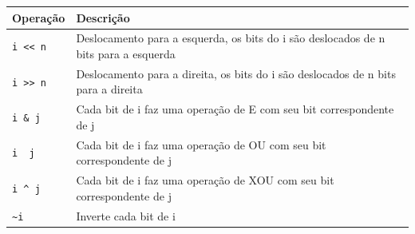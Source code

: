 \documentclass[
]{article}
\begin{document}
\begin{longtable}[]{@{}ll@{}}
\toprule
\begin{minipage}[b]{0.14\columnwidth}\raggedright
Operação\strut
\end{minipage} & \begin{minipage}[b]{0.80\columnwidth}\raggedright
Descrição\strut
\end{minipage}\tabularnewline
\midrule
\endhead
\begin{minipage}[t]{0.14\columnwidth}\raggedright
\texttt{i\ \textless{}\textless{}\ n}\strut
\end{minipage} & \begin{minipage}[t]{0.80\columnwidth}\raggedright
Deslocamento para a esquerda, os bits do i são deslocados de n bits para
a esquerda\strut
\end{minipage}\tabularnewline
\begin{minipage}[t]{0.14\columnwidth}\raggedright
\texttt{i\ \textgreater{}\textgreater{}\ n}\strut
\end{minipage} & \begin{minipage}[t]{0.80\columnwidth}\raggedright
Deslocamento para a direita, os bits do i são deslocados de n bits para
a direita\strut
\end{minipage}\tabularnewline
\begin{minipage}[t]{0.14\columnwidth}\raggedright
\texttt{i\ \&\ j}\strut
\end{minipage} & \begin{minipage}[t]{0.80\columnwidth}\raggedright
Cada bit de i faz uma operação de E com seu bit correspondente de
j\strut
\end{minipage}\tabularnewline
\begin{minipage}[t]{0.14\columnwidth}\raggedright
\texttt{i\ \textbar{}\ j}\strut
\end{minipage} & \begin{minipage}[t]{0.80\columnwidth}\raggedright
Cada bit de i faz uma operação de OU com seu bit correspondente de
j\strut
\end{minipage}\tabularnewline
\begin{minipage}[t]{0.14\columnwidth}\raggedright
\texttt{i\ \^{}\ j}\strut
\end{minipage} & \begin{minipage}[t]{0.80\columnwidth}\raggedright
Cada bit de i faz uma operação de XOU com seu bit correspondente de
j\strut
\end{minipage}\tabularnewline
\begin{minipage}[t]{0.14\columnwidth}\raggedright
\texttt{\textasciitilde{}i}\strut
\end{minipage} & \begin{minipage}[t]{0.80\columnwidth}\raggedright
Inverte cada bit de i\strut
\end{minipage}\tabularnewline
\bottomrule
\end{longtable}
\end{document}
